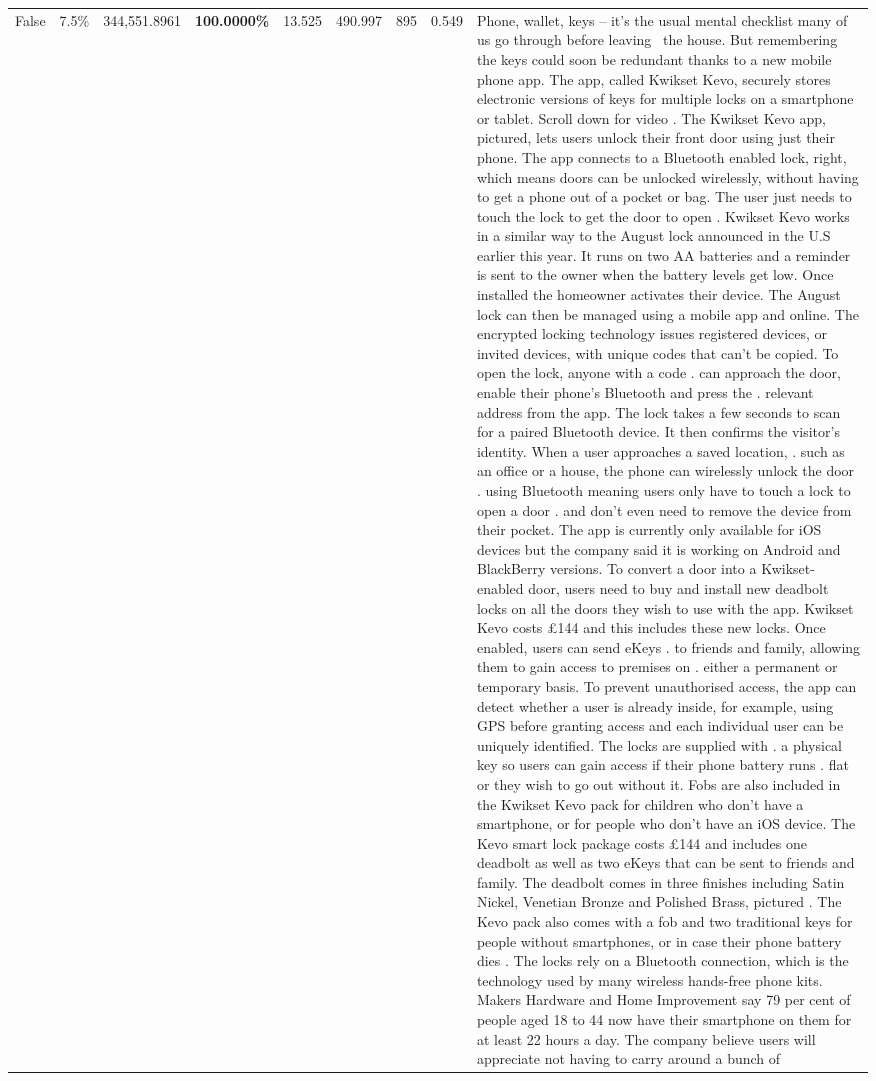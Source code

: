 \begin{table}[H]
\begin{tabular}{lllrlllll}
False & 7.5\% & 344,551.8961 & \bfseries \color{red} 100.0000\% & 13.525 & 490.997 & 895 & 0.549 & Phone, wallet, keys – it’s the usual mental checklist many of us go through before leaving  the house. But remembering the keys could soon be redundant thanks to a new mobile phone app. The app, called Kwikset Kevo, securely stores electronic versions of keys for multiple locks on a smartphone or tablet. Scroll down for video . The Kwikset Kevo app, pictured, lets users unlock their front door using just their phone. The app connects to a Bluetooth enabled lock, right, which means doors can be unlocked wirelessly, without having to get a phone out of a pocket or bag. The user just needs to touch the lock to get the door to open . Kwikset Kevo works in a similar way to the August lock announced in the U.S earlier this year. It runs on two AA batteries and a reminder is sent to the owner when the battery levels get low. Once installed the homeowner activates their device. The August lock can then be managed using a mobile app and online. The encrypted locking technology issues registered devices, or invited devices, with unique codes that can't be copied. To open the lock, anyone with a code . can approach the door, enable their phone's Bluetooth and press the . relevant address from the app. The lock takes a few seconds to scan for a paired Bluetooth device. It then confirms the visitor's identity. When a user approaches a saved location, . such as an office or a house, the phone can wirelessly unlock the door . using Bluetooth meaning users only have to touch a lock to open a door . and don't even need to remove the device from their pocket. The app is currently only available for iOS devices but the company said it is working on Android and BlackBerry versions. To convert a door into a Kwikset-enabled door, users need to buy and install new deadbolt locks on all the doors they wish to use with the app. Kwikset Kevo costs £144 and this includes these new locks. Once enabled, users can send eKeys . to friends and family, allowing them to gain access to premises on . either a permanent or temporary basis. To prevent unauthorised access, the app can detect whether a user is already inside, for example, using GPS before granting access and each individual user can be uniquely identified. The locks are supplied with . a physical key so users can gain access if their phone battery runs . flat or they wish to go out without it. Fobs are also included in the Kwikset Kevo pack for children who don't have a smartphone, or for people who don't have an iOS device. The Kevo smart lock package costs £144 and includes one deadbolt as well as two eKeys that can be sent to friends and family. The deadbolt comes in three finishes including Satin Nickel, Venetian Bronze and Polished Brass, pictured . The Kevo pack also comes with a fob and two traditional keys for people without smartphones, or in case their phone battery dies . The locks rely on a Bluetooth connection, which is the technology used by many wireless hands-free phone kits. Makers Hardware and Home Improvement say 79 per cent of people aged 18 to 44 now have their smartphone on them for at least 22 hours a day. The company believe users will appreciate not having to carry around a bunch of 
\end{tabular}
\end{table}
